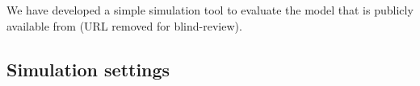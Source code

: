 
We have developed a simple simulation tool to evaluate the model
that is publicly available from (URL removed for blind-review).

\subsection{Simulation settings}


